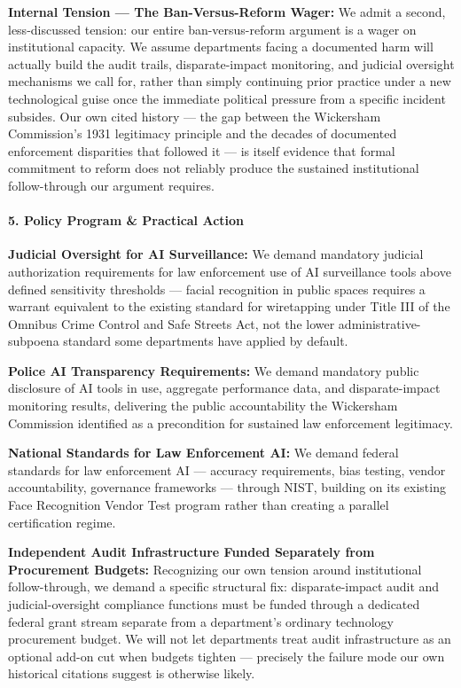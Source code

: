 \textbf{Internal Tension --- The Ban-Versus-Reform Wager:} We admit a
second, less-discussed tension: our entire ban-versus-reform argument is
a wager on institutional capacity. We assume departments facing a
documented harm will actually build the audit trails, disparate-impact
monitoring, and judicial oversight mechanisms we call for, rather than
simply continuing prior practice under a new technological guise once
the immediate political pressure from a specific incident subsides. Our
own cited history --- the gap between the Wickersham Commission's 1931
legitimacy principle and the decades of documented enforcement
disparities that followed it --- is itself evidence that formal
commitment to reform does not reliably produce the sustained
institutional follow-through our argument requires.

\paragraph{5. Policy Program \& Practical
Action}\label{policy-program-practical-action-26}

\textbf{Judicial Oversight for AI Surveillance:} We demand mandatory
judicial authorization requirements for law enforcement use of AI
surveillance tools above defined sensitivity thresholds --- facial
recognition in public spaces requires a warrant equivalent to the
existing standard for wiretapping under Title III of the Omnibus Crime
Control and Safe Streets Act, not the lower administrative-subpoena
standard some departments have applied by default.

\textbf{Police AI Transparency Requirements:} We demand mandatory public
disclosure of AI tools in use, aggregate performance data, and
disparate-impact monitoring results, delivering the public
accountability the Wickersham Commission identified as a precondition
for sustained law enforcement legitimacy.

\textbf{National Standards for Law Enforcement AI:} We demand federal
standards for law enforcement AI --- accuracy requirements, bias
testing, vendor accountability, governance frameworks --- through NIST,
building on its existing Face Recognition Vendor Test program rather
than creating a parallel certification regime.

\textbf{Independent Audit Infrastructure Funded Separately from
Procurement Budgets:} Recognizing our own tension around institutional
follow-through, we demand a specific structural fix: disparate-impact
audit and judicial-oversight compliance functions must be funded through
a dedicated federal grant stream separate from a department's ordinary
technology procurement budget. We will not let departments treat audit
infrastructure as an optional add-on cut when budgets tighten ---
precisely the failure mode our own historical citations suggest is
otherwise likely.


